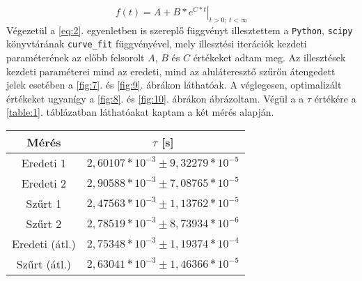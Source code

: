 \begin{multicols}{2}
\begin{equation}
f \left( t \right)
=
\left. A + B * e^{C * t} \right|_{t > 0;\ t < \infty}
\end{equation}
Végezetül a \ref{eq:2}. egyenletben is szereplő függvényt illesztettem a \texttt{Python}, \texttt{scipy} könyvtárának \texttt{curve\_fit} függvényével, mely illesztési iterációk kezdeti paraméterének az előbb felsorolt $A$, $B$ és $C$ értékeket adtam meg. \newline
Az illesztések kezdeti paraméterei mind az eredeti, mind az aluláteresztő szűrőn átengedett jelek esetében a \ref{fig:7}. és \ref{fig:9}. ábrákon láthatóak. A véglegesen, optimalizált értékeket ugyanígy a \ref{fig:8}. és \ref{fig:10}. ábrákon ábrázoltam. \newline
Végül a a $\tau$ értékére a \ref{table:1}. táblázatban láthatóakat kaptam a két mérés alapján.

\begin{center}
\begin{tabular}{|c|c|}
\hline
Mérés              & $\tau$ [s]                                \\ \hline
Eredeti 1          & $2,60107 * 10^{-3} \pm 9,32279 * 10^{-5}$ \\ \hline
Eredeti 2          & $2,90588 * 10^{-3} \pm 7,08765 * 10^{-5}$ \\ \hline
Szűrt 1            & $2,47563 * 10^{-3} \pm 1,13762 * 10^{-5}$ \\ \hline
Szűrt 2            & $2,78519 * 10^{-3} \pm 8,73934 * 10^{-6}$ \\ \hline \hline
Eredeti (átl.)     & $2,75348 * 10^{-3} \pm 1,19374 * 10^{-4}$ \\ \hline
Szűrt (átl.)       & $2,63041 * 10^{-3} \pm 1,46366 * 10^{-5}$ \\ \hline
\end{tabular}
 \label{table:1}
\end{center}


\end{multicols}
